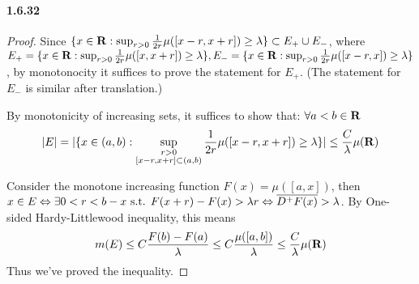 \documentclass{article}
\begin{document}
\paragraph{1.6.32}
\begin{proof}
Since $\{x\in\mathbf{R}:\sup_{r>0}\frac 1 {2r}\mu([x-r,x+r])\geq \lambda\}\subset E_+\cup E_-$, where $E_+=\{x\in\mathbf{R}:\sup_{r>0}\frac 1 {2r}\mu([x,x+r])\geq \lambda\}, E_-=\{x\in\mathbf{R}:\sup_{r>0}\frac 1 {2r}\mu([x-r,x])\geq \lambda\}$, by monotonocity it suffices to prove the statement for $E_+$. (The statement for $E_-$ is similar after translation.)

By monotonicity of increasing sets, it suffices to show that: $\forall a<b\in\mathbf{R}$
\[|E|=|\{x\in (a,b):\sup_{\substack{r>0 \\ [x-r,x+r]\subset (a,b)}}\frac{1}{2r}\mu([x-r,x+r])\geq\lambda\}|\leq \frac{C}{\lambda}\mu(\mathbf{R})\]

Consider the monotone increasing function $F(x)=\mu([a,x])$, then $x\in E\Leftrightarrow \exists 0<r<b-x \text{ s.t. } F(x+r)-F(x)>\lambda r\Leftrightarrow \overline{D^+F(x)}>\lambda$. By One-sided Hardy-Littlewood inequality, this means
\[m(E)\leq C\frac{F(b)-F(a)}{\lambda}\leq C\frac{\mu([a,b])}{\lambda}\leq \frac{C}{\lambda}\mu(\mathbf{R})\]
Thus we've proved the inequality.
\end{proof}
\end{document}
